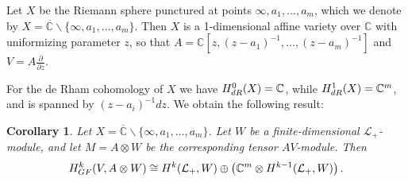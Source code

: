\documentclass[12pt]{amsart}
\newcommand{\C}{{\mathbb{C}}}
\renewcommand{\L}{{\mathcal{L}}}
\newcommand{\DR}{{\textup{dR}}}
\newcommand{\GF}{{\textup{GF}}}
\newtheorem{corollary}[theorem]{Corollary}
\theoremstyle{definition}
\begin{document}
Let $X$ be the Riemann sphere punctured at points $\infty, a_1, \dots, a_m$, which we denote by 
$X = \overline{\C} \backslash\{\infty, a_1, \dots, a_m\}$. Then $X$ is a 1-dimensional affine variety over $\C$ with uniformizing parameter $z$, so that $A = \C[z, (z- a_1)^{-1}, \dots, (z-a_m)^{-1}]$ and $V = A \frac{\partial}{\partial z}$. 

For the de Rham cohomology of $X$ we have $H^0_\DR(X) = \C$, while $H^1_\DR(X) = \C^m$, and is spanned by $(z-a_i)^{-1} dz$. We obtain the following result:
\begin{corollary}
Let $X = \overline{\C} \backslash\{\infty, a_1, \dots, a_m\}$. 
Let $W$ be a finite-dimensional $\L_+$-module, and let $M = A \otimes W$ be the corresponding tensor $AV$-module. Then 
\[
H_\GF^k(V, A \otimes W) \cong H^{k}(\L_+, W) \oplus \left(\C^m \otimes H^{k-1}(\L_+, W) \right).
\]
\end{corollary}


%
% 
\end{document}
